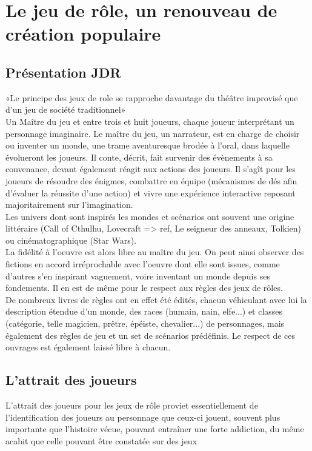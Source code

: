 \documentclass[a4paper,12pt,final,oneside]{article}
\begin{document}
\section{Le jeu de rôle, un renouveau de création populaire}
\cite{caira2007jeux}
\subsection{Présentation JDR}
«Le principe des jeux de role se rapproche davantage du théâtre improvisé que d'un jeu de société traditionnel» \cite{cristofari2010lecteur}\\
Un Maître du jeu et entre trois et huit joueurs, chaque joueur interprétant un personnage imaginaire. Le maître du jeu, un narrateur, est en charge de choisir ou inventer un monde, une trame aventuresque brodée à l'oral, dans laquelle évolueront les joueurs. Il conte, décrit, fait survenir des évènements à sa convenance, devant également réagit aux actions des joueurs. Il s'agît pour les joueurs de résoudre des énigmes, combattre en équipe (mécanismes de dés afin d'évaluer la réussite d'une action) et vivre une expérience interactive reposant majoritairement sur l'imagination.\\

Les univers dont sont inspirés les mondes et scénarios ont souvent une origine littéraire (Call of Cthulhu, Lovecraft => ref, Le seigneur des anneaux, Tolkien) ou cinématographique (Star Wars).\\
La fidélité à l'oeuvre est alors libre au maître du jeu. On peut ainsi observer des fictions en accord irréprochable avec l'oeuvre dont elle sont issues, comme d'autres s'en inspirant vaguement, voire inventant un monde depuis ses fondements. Il en est de même pour le respect aux règles des jeux de rôles.\\
De nombreux livres de règles ont en effet été édités, chacun véhiculant avec lui la description étendue d'un monde, des races (humain, nain, elfe...) et classes (catégorie, telle magicien, prêtre, épéiste, chevalier...) de personnages, mais également des règles de jeu et un set de scénarios prédéfinis. Le respect de ces ouvrages est également laissé libre à chacun.\\

\subsection{L'attrait des joueurs}
L'attrait des joueurs pour les jeux de rôle proviet essentiellement de l'identification des joueurs au personnage que ceux-ci jouent, souvent plus importante que l'histoire vécue, pouvant entraîner une forte addiction, du même acabit que celle pouvant être constatée sur des jeux
\end{document}
